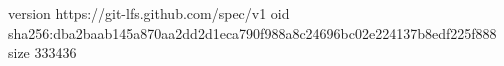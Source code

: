 version https://git-lfs.github.com/spec/v1
oid sha256:dba2baab145a870aa2dd2d1eca790f988a8c24696bc02e224137b8edf225f888
size 333436
